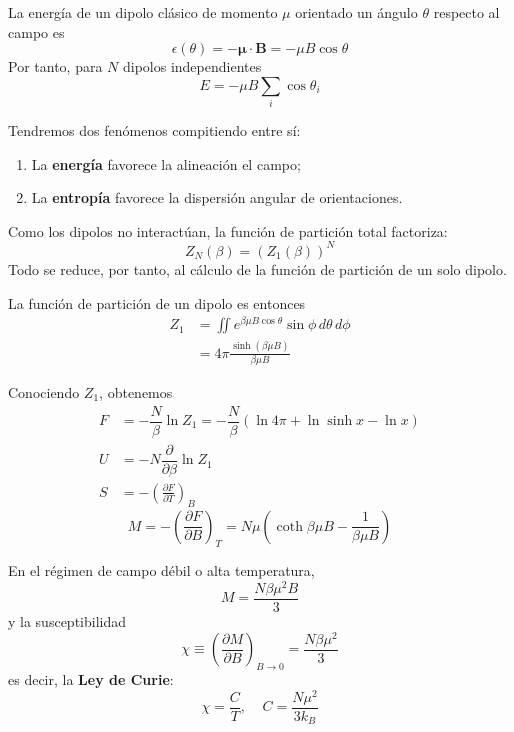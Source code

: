 \documentclass[]{article}
\numberwithin{equation}{section}
\newcommand{\deriv}[3]{\left(\frac{\partial #1}{\partial #2} \right)_{#3}}
\newcommand{\0}{\textcolor{gray}{0}}
\newcommand{\pd}[2]{\dfrac{\partial #1}{\partial #2}}
\newcommand{\n}[1]{\mathbf{#1}}
\begin{document}
La energía de un dipolo clásico de momento $\mu$ orientado un ángulo $\theta$ respecto al campo es
\begin{equation}
	\epsilon(\theta) = -\n{\mu}\cdot\n{B} = -\mu B \cos\theta
\end{equation}
Por tanto, para $N$ dipolos independientes
\begin{equation}
	E = -\mu B \sum_{i}\cos\theta_i
\end{equation}


Tendremos dos fenómenos compitiendo entre sí:
\begin{enumerate}
	\item La \textbf{energía} favorece la alineación el campo;
	\item La \textbf{entropía} favorece la dispersión angular de orientaciones.
\end{enumerate}

Como los dipolos no interactúan, la función de partición total factoriza:
\begin{equation}
	Z_N(\beta) = \left(Z_1(\beta)\right)^N
\end{equation}
Todo se reduce, por tanto, al cálculo de la función de partición de un solo dipolo.

La función de partición de un dipolo es entonces
\begin{align}
	Z_1 &= \iint e^{\beta \mu B \cos\theta} \sin\phi \, d\theta \, d\phi\\
	&= 4\pi \frac{\sinh \left(\beta\mu B\right)}{\beta\mu B}
\end{align}

Conociendo \(Z_1\), obtenemos
\begin{align}
	F &= -\dfrac{N}{\beta}\ln Z_1 = - \dfrac{N}{\beta} \left(\ln 4\pi + \ln\sinh x - \ln x\right)\\
	U &= -N \pd{}{\beta}\ln Z_1\\
	S &= -\deriv{F}{T}{B}
\end{align}
\begin{equation}
	M = -\deriv{F}{B}{T} = N\mu\left(\coth \beta\mu B - \frac{1}{\beta \mu B}\right)
\end{equation}

En el régimen de campo débil o alta temperatura,
\begin{equation}
	M = \frac{N \beta \mu^2 B}{3}
\end{equation}
y la susceptibilidad
\begin{equation}
	\chi \equiv \deriv{M}{B}{B\rightarrow 0} = \frac{N\beta\mu^2}{3}
\end{equation}
es decir, la \textbf{Ley de Curie}:
\begin{equation}
	\chi = \frac{C}{T}, ~~~~~ C = \frac{N \mu^2}{3 k_B}
\end{equation}
\end{document}
